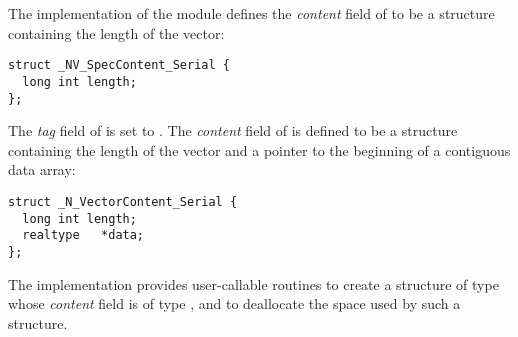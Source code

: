%
The {\nvecs} implementation of the {\nvector} module
defines the {\em content} field of  to be a structure 
containing the length of the vector:
\begin{verbatim}
struct _NV_SpecContent_Serial {
  long int length;
};
\end{verbatim}
The {\em tag} field of  is set to .
The {\em content} field of  is defined to be a structure containing
the length of the vector and a pointer to the beginning of a contiguous data array:
\begin{verbatim} 
struct _N_VectorContent_Serial {
  long int length;
  realtype   *data;
};
\end{verbatim}

The {\nvecs} implementation provides user-callable routines  
to create a structure of type  whose {\em content} field is 
of type , and  
to deallocate the space used by such a structure. 

